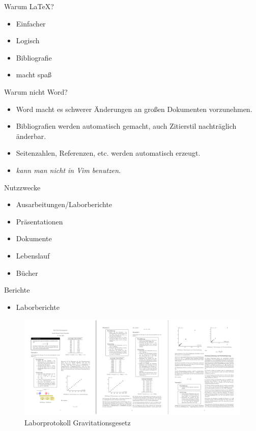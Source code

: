 \documentclass{beamer}
\begin{document}
\begin{frame}{Warum \LaTeX?}
    \begin{itemize}
        \item Einfacher
        \item Logisch
        \item Bibliografie
        \item macht spa\ss
    \end{itemize}
\end{frame}



\begin{frame}{Warum nicht Word?}
    \begin{itemize}
        \item Word macht es schwerer \"Anderungen an gro\ss{}en Dokumenten vorzunehmen.
        \item Bibliografien werden automatisch gemacht, auch Zitierstil nachtr\"aglich \"anderbar.
        \item Seitenzahlen, Referenzen, etc. werden automatisch erzeugt.
        \item \textit{kann man nicht in Vim benutzen.}
    \end{itemize}
    
\end{frame}




\begin{frame}{Nutzzwecke}

    \begin{itemize}
        \item Ausarbeitungen/Laborberichte
        \item Pr\"asentationen
        \item Dokumente
        \item Lebenslauf
        \item B\"ucher
    \end{itemize}
\end{frame}




\begin{frame}{Berichte}
    \begin{itemize}
        \item Laborberichte 
    \end{itemize}
    \begin{figure}[htpb]
        \centering
        \includegraphics[width=1\textwidth]{./figs/am stueck.png}
        \caption{Laborprotokoll Gravitationsgesetz}
        \label{fig:}
    \end{figure}
\end{frame}
\end{document}
